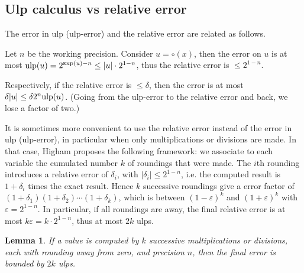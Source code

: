 \documentclass[12pt]{amsart}
\def\ulp{{\rm ulp}}
\def\Exp{{\rm \textsc exp}}
\newtheorem{lemma}{Lemma}
\begin{document}
\subsection{Ulp calculus vs relative error}

The error in ulp (ulp-error) and the relative error are related as follows.

Let $n$ be the working precision.
Consider $u = \circ(x)$, then the error on $u$ is at most
$\ulp(u) = 2^{\Exp(u)-n} \leq |u| \cdot 2^{1-n}$, thus the relative error
is $\leq 2^{1-n}$.

Respectively, if the relative error is $\leq \delta$, then the error
is at most $\delta |u| \leq \delta 2^n \ulp(u)$. (Going from the ulp-error
to the relative error and back, we lose a factor of two.)

It is sometimes more convenient to use the relative error instead of the
error in ulp (ulp-error), in particular when only multiplications or
divisions are made.
In that case,
Higham \cite{Higham02} proposes the following framework:
we associate to each variable the cumulated number $k$ of roundings that were
made.
The $i$th rounding introduces a relative error of $\delta_i$,
with $|\delta_i| \leq 2^{1-n}$, i.e. the computed result is
$1+\delta_i$ times the exact result.
Hence $k$ successive roundings give a error factor of $(1+\delta_1)
(1+\delta_2) \cdots (1+\delta_k)$, which is between $(1-\varepsilon)^k$
and $(1+\varepsilon)^k$ with $\varepsilon = 2^{1-n}$.
In particular, if all roundings are away, the final relative error is
at most $k \varepsilon = k \cdot 2^{1-n}$, thus at most $2k$ ulps.

\begin{lemma} \label{rel_ulp}
If a value is computed by $k$ successive multiplications or divisions,
each with rounding away from zero, and precision $n$, then the final
error is bounded by $2k$ ulps.
\end{lemma}
\end{document}
